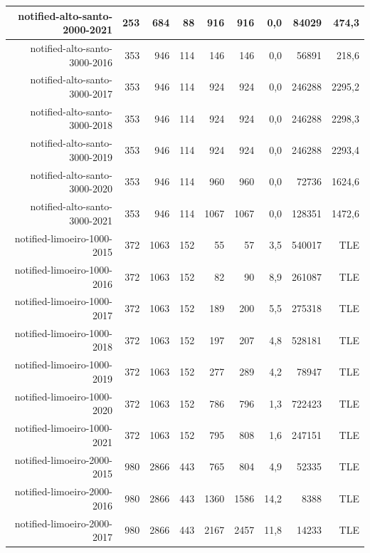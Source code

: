 \documentclass[a4paper,11pt]{article}
\begin{document}
\begin{table}[!ht]
{\begin{tabular}{rrrrrrrrr}
\rowcolor[HTML]{9B9B9B} 
notified-alto-santo-2000-2021 & 253  & 684  & 88  & 916  & 916   & 0,0  & 84029  & 474,3  \\ \hline
\rowcolor[HTML]{9B9B9B} 
notified-alto-santo-3000-2016 & 353  & 946  & 114 & 146  & 146   & 0,0  & 56891  & 218,6  \\
\rowcolor[HTML]{9B9B9B} 
notified-alto-santo-3000-2017 & 353  & 946  & 114 & 924  & 924   & 0,0  & 246288 & 2295,2 \\
\rowcolor[HTML]{9B9B9B} 
notified-alto-santo-3000-2018 & 353  & 946  & 114 & 924  & 924   & 0,0  & 246288 & 2298,3 \\
\rowcolor[HTML]{9B9B9B} 
notified-alto-santo-3000-2019 & 353  & 946  & 114 & 924  & 924   & 0,0  & 246288 & 2293,4 \\
\rowcolor[HTML]{9B9B9B} 
notified-alto-santo-3000-2020 & 353  & 946  & 114 & 960  & 960   & 0,0  & 72736  & 1624,6 \\
\rowcolor[HTML]{9B9B9B} 
notified-alto-santo-3000-2021 & 353  & 946  & 114 & 1067 & 1067  & 0,0  & 128351 & 1472,6 \\ \hline
\rowcolor[HTML]{C0C0C0} 
notified-limoeiro-1000-2015   & 372  & 1063 & 152 & 55   & 57    & 3,5  & 540017 & TLE    \\
\rowcolor[HTML]{C0C0C0} 
notified-limoeiro-1000-2016   & 372  & 1063 & 152 & 82   & 90    & 8,9  & 261087 & TLE    \\
\rowcolor[HTML]{C0C0C0} 
notified-limoeiro-1000-2017   & 372  & 1063 & 152 & 189  & 200   & 5,5  & 275318 & TLE    \\
\rowcolor[HTML]{C0C0C0} 
notified-limoeiro-1000-2018   & 372  & 1063 & 152 & 197  & 207   & 4,8  & 528181 & TLE    \\
\rowcolor[HTML]{C0C0C0} 
notified-limoeiro-1000-2019   & 372  & 1063 & 152 & 277  & 289   & 4,2  & 78947  & TLE    \\
\rowcolor[HTML]{C0C0C0} 
notified-limoeiro-1000-2020   & 372  & 1063 & 152 & 786  & 796   & 1,3  & 722423 & TLE    \\
\rowcolor[HTML]{C0C0C0} 
notified-limoeiro-1000-2021   & 372  & 1063 & 152 & 795  & 808   & 1,6  & 247151 & TLE    \\ \hline
\rowcolor[HTML]{C0C0C0} 
notified-limoeiro-2000-2015   & 980  & 2866 & 443 & 765  & 804   & 4,9  & 52335  & TLE    \\
\rowcolor[HTML]{C0C0C0} 
notified-limoeiro-2000-2016   & 980  & 2866 & 443 & 1360 & 1586  & 14,2 & 8388   & TLE    \\
\rowcolor[HTML]{C0C0C0} 
notified-limoeiro-2000-2017   & 980  & 2866 & 443 & 2167 & 2457  & 11,8 & 14233  & TLE    \\

\end{tabular}}
\end{table}
\end{document}
